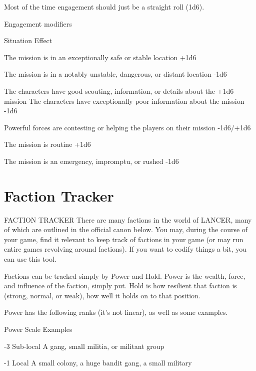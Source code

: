 Most of the time engagement should just be a straight roll (1d6).

                                         Engagement modifiers





 Situation                                                                             Effect

 The mission is in an exceptionally safe or stable location                            +1d6

 The mission is in a notably unstable, dangerous, or distant location                  -1d6

 The characters have good scouting, information, or details about the                  +1d6
 mission
 The characters have exceptionally poor information about the mission                  -1d6

 Powerful forces are contesting or helping the players on their mission                -1d6/+1d6

 The mission is routine                                                                +1d6

 The mission is an emergency, impromptu, or rushed                                     -1d6

\chapter{Faction Tracker}
                                       FACTION TRACKER
There are many factions in the world of LANCER, many of which are outlined in the official canon
below. You may, during the course of your game, find it relevant to keep track of factions in your
game (or may run entire games revolving around factions). If you want to codify things a bit, you
can use this tool.

Factions can be tracked simply by Power and Hold. Power is the wealth, force, and influence of
the faction, simply put. Hold is how resilient that faction is (strong, normal, or weak), how well it
holds on to that position.

Power has the following ranks (it’s not linear), as well as some examples.

            Power      Scale             Examples

            -3         Sub-local        A gang, small militia, or militant group

            -1         Local            A small colony, a huge bandit gang, a small military

